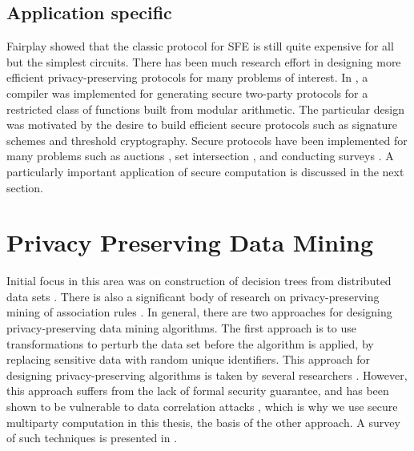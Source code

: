 \subsection{Application specific}

Fairplay showed that the classic protocol for SFE is still quite expensive
for all but the simplest circuits. There has been much research effort
in designing more efficient privacy-preserving protocols for many
problems of interest. In \cite{Reiter:CCS:2003}, a compiler was implemented
for generating secure two-party protocols for a restricted class of
functions built from modular arithmetic. The particular design was
motivated by the desire to build efficient secure protocols such as
signature schemes and threshold cryptography. Secure protocols have
been implemented for many problems such as auctions \cite{NPS99},
set intersection \cite{FNP04}, and conducting surveys \cite{FNP04}.
A particularly important application of secure computation is discussed
in the next section.


\section{Privacy Preserving Data Mining }

Initial focus in this area was on construction of decision trees from
distributed data sets \cite{Agrawal-Srikant,Lindell-Pinkas}. There
is also a significant body of research on privacy-preserving mining
of association rules \cite{Gehrke:2002,RizviHarista,VaidyaClifton:2002}.
In general, there are two approaches for designing privacy-preserving
data mining algorithms. The first approach is to use transformations
to perturb the data set before the algorithm is applied, by replacing
sensitive data with random unique identifiers. This approach for designing
privacy-preserving algorithms is taken by several researchers \cite{Klusch,MeruguGhosh,Oliveira}.
However, this approach suffers from the lack of formal security guarantee,
and has been shown to be vulnerable to data correlation attacks \cite{Malin04},
which is why we use secure multiparty computation in this thesis,
the basis of the other approach. A survey of such techniques is presented
in \cite{PinkasCryptoPPDM02}. 

%
\begin{comment}
 


\end{comment}
{} 
